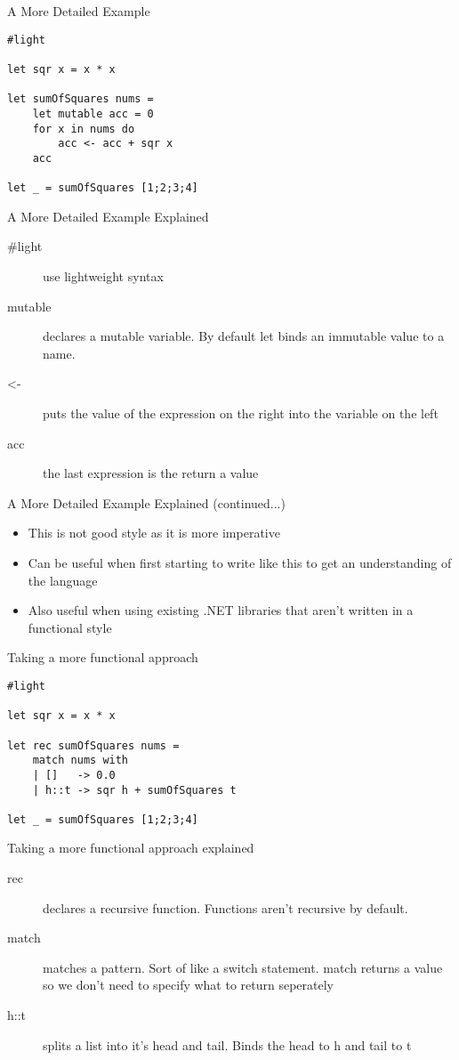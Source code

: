 \documentclass[landscape]{slides}
\begin{document}
\begin{slide}{A More Detailed Example}
\begin{verbatim}
#light

let sqr x = x * x

let sumOfSquares nums =
    let mutable acc = 0
    for x in nums do
        acc <- acc + sqr x
    acc

let _ = sumOfSquares [1;2;3;4]
\end{verbatim}
\end{slide}

\begin{slide}{A More Detailed Example Explained}
\begin{description}
\item[\#light] use lightweight syntax
\item[mutable] declares a mutable variable. By default let binds an immutable value to a name.
\item[\textless-] puts the value of the expression on the right into the variable on the left
\item[acc] the last expression is the return a value
\end{description}
\end{slide}

\begin{slide}{A More Detailed Example Explained (continued...)}
\begin{itemize}
\item This is not good style as it is more imperative
\item Can be useful when first starting to write like this to get an understanding of the language
\item Also useful when using existing .NET libraries that aren't written in a functional style
\end{itemize}
\end{slide}

\begin{slide}{Taking a more functional approach}
\begin{verbatim}
#light

let sqr x = x * x

let rec sumOfSquares nums =
    match nums with
    | []   -> 0.0
    | h::t -> sqr h + sumOfSquares t

let _ = sumOfSquares [1;2;3;4]
\end{verbatim}
\end{slide}

\begin{slide}{Taking a more functional approach explained}
\begin{description}
\item[rec] declares a recursive function. Functions aren't recursive by default.
\item[match] matches a pattern. Sort of like a switch statement. match returns a value so we don't need to specify what to return seperately
\item[h::t] splits a list into it's head and tail. Binds the head to h and tail to t
\end{description}
\end{slide}
\end{document}
